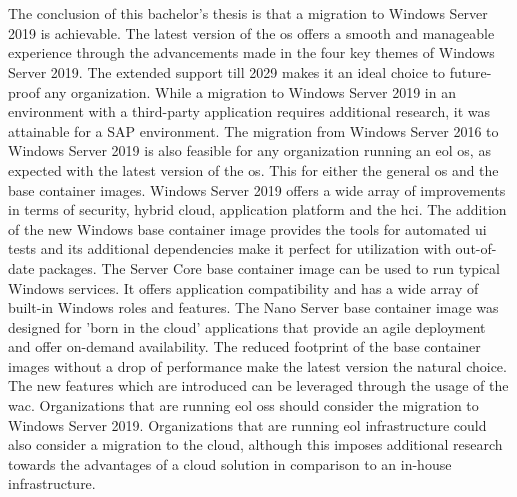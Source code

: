 \chapter{}
\label{ch:conclusie}
The conclusion of this bachelor's thesis is that a migration to Windows Server 2019 is achievable.
The latest version of the \acrshort{os} offers a smooth and manageable experience through the advancements made in the four key themes of Windows Server 2019. 
The extended support till 2029 makes it an ideal choice to future-proof any organization. 
While a migration to Windows Server 2019 in an environment with a third-party application requires additional research, it was attainable for a SAP environment. 
The migration from Windows Server 2016 to Windows Server 2019 is also feasible for any organization running an \acrshort{eol} \acrshort{os}, as expected with the latest version of the \acrshort{os}.
This for either the general \acrshort{os} and the base container images.
Windows Server 2019 offers a wide array of improvements in terms of security, hybrid cloud, application platform and the \acrfull{hci}.
The addition of the new Windows base container image provides the tools for automated \acrshort{ui} tests and its additional dependencies make it perfect for utilization with out-of-date packages. 
The Server Core base container image can be used to run typical Windows services. 
It offers application compatibility and has a wide array of built-in Windows roles and features. 
The Nano Server base container image was designed for 'born in the cloud' applications that provide an agile deployment and offer on-demand availability. 
The reduced footprint of the base container images without a drop of performance make the latest version the natural choice. 
The new features which are introduced can be leveraged through the usage of the \acrfull{wac}.
Organizations that are running \acrshort{eol} \acrlong{os}s should consider the migration to Windows Server 2019.
Organizations that are running \acrshort{eol} infrastructure could also consider a migration to the cloud, although this imposes additional research towards the advantages of a cloud solution in comparison to an in-house infrastructure.
